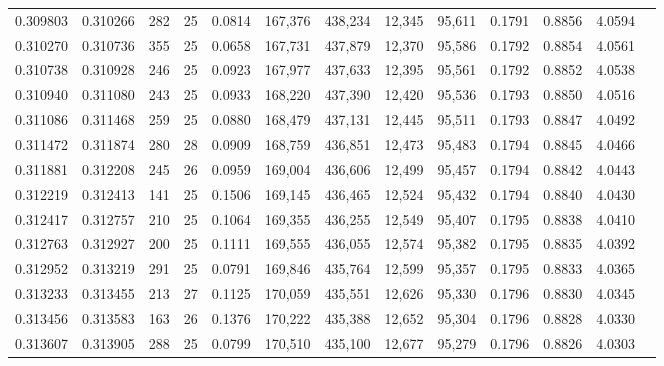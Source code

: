 \begin{tabular}{rrrrrrrrrrrrr}
0.309803 & 0.310266 &   282 &  25 &                                     0.0814 & 167,376 & 438,234 &  12,345 &  95,611 & 0.1791 & 0.8856 & 4.0594 \\
0.310270 & 0.310736 &   355 &  25 &                                     0.0658 & 167,731 & 437,879 &  12,370 &  95,586 & 0.1792 & 0.8854 & 4.0561 \\
0.310738 & 0.310928 &   246 &  25 &                                     0.0923 & 167,977 & 437,633 &  12,395 &  95,561 & 0.1792 & 0.8852 & 4.0538 \\
0.310940 & 0.311080 &   243 &  25 &                                     0.0933 & 168,220 & 437,390 &  12,420 &  95,536 & 0.1793 & 0.8850 & 4.0516 \\
0.311086 & 0.311468 &   259 &  25 &                                     0.0880 & 168,479 & 437,131 &  12,445 &  95,511 & 0.1793 & 0.8847 & 4.0492 \\
0.311472 & 0.311874 &   280 &  28 &                                     0.0909 & 168,759 & 436,851 &  12,473 &  95,483 & 0.1794 & 0.8845 & 4.0466 \\
0.311881 & 0.312208 &   245 &  26 &                                     0.0959 & 169,004 & 436,606 &  12,499 &  95,457 & 0.1794 & 0.8842 & 4.0443 \\
0.312219 & 0.312413 &   141 &  25 &                                     0.1506 & 169,145 & 436,465 &  12,524 &  95,432 & 0.1794 & 0.8840 & 4.0430 \\
0.312417 & 0.312757 &   210 &  25 &                                     0.1064 & 169,355 & 436,255 &  12,549 &  95,407 & 0.1795 & 0.8838 & 4.0410 \\
0.312763 & 0.312927 &   200 &  25 &                                     0.1111 & 169,555 & 436,055 &  12,574 &  95,382 & 0.1795 & 0.8835 & 4.0392 \\
0.312952 & 0.313219 &   291 &  25 &                                     0.0791 & 169,846 & 435,764 &  12,599 &  95,357 & 0.1795 & 0.8833 & 4.0365 \\
0.313233 & 0.313455 &   213 &  27 &                                     0.1125 & 170,059 & 435,551 &  12,626 &  95,330 & 0.1796 & 0.8830 & 4.0345 \\
0.313456 & 0.313583 &   163 &  26 &                                     0.1376 & 170,222 & 435,388 &  12,652 &  95,304 & 0.1796 & 0.8828 & 4.0330 \\
0.313607 & 0.313905 &   288 &  25 &                                     0.0799 & 170,510 & 435,100 &  12,677 &  95,279 & 0.1796 & 0.8826 & 4.0303 \\

\end{tabular}
